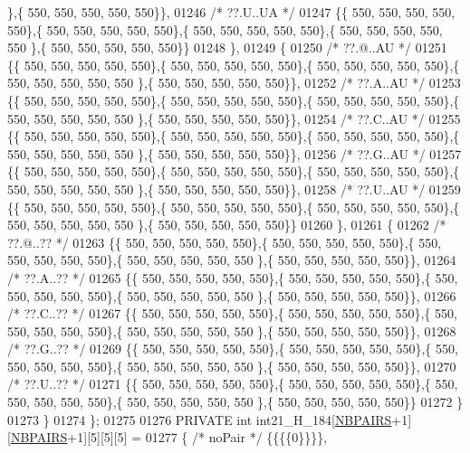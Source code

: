 \begin{DoxyCode}
      \},\{ 550, 550, 550, 550, 550\}\},
01246 \textcolor{comment}{/* ??.U..UA */}
01247 \{\{ 550, 550, 550, 550, 550\},\{ 550, 550, 550, 550, 550\},\{ 550, 550, 550, 550, 550\},\{ 550, 550, 550, 550, 550
      \},\{ 550, 550, 550, 550, 550\}\}
01248 \},
01249 \{
01250 \textcolor{comment}{/* ??.@..AU */}
01251 \{\{ 550, 550, 550, 550, 550\},\{ 550, 550, 550, 550, 550\},\{ 550, 550, 550, 550, 550\},\{ 550, 550, 550, 550, 550
      \},\{ 550, 550, 550, 550, 550\}\},
01252 \textcolor{comment}{/* ??.A..AU */}
01253 \{\{ 550, 550, 550, 550, 550\},\{ 550, 550, 550, 550, 550\},\{ 550, 550, 550, 550, 550\},\{ 550, 550, 550, 550, 550
      \},\{ 550, 550, 550, 550, 550\}\},
01254 \textcolor{comment}{/* ??.C..AU */}
01255 \{\{ 550, 550, 550, 550, 550\},\{ 550, 550, 550, 550, 550\},\{ 550, 550, 550, 550, 550\},\{ 550, 550, 550, 550, 550
      \},\{ 550, 550, 550, 550, 550\}\},
01256 \textcolor{comment}{/* ??.G..AU */}
01257 \{\{ 550, 550, 550, 550, 550\},\{ 550, 550, 550, 550, 550\},\{ 550, 550, 550, 550, 550\},\{ 550, 550, 550, 550, 550
      \},\{ 550, 550, 550, 550, 550\}\},
01258 \textcolor{comment}{/* ??.U..AU */}
01259 \{\{ 550, 550, 550, 550, 550\},\{ 550, 550, 550, 550, 550\},\{ 550, 550, 550, 550, 550\},\{ 550, 550, 550, 550, 550
      \},\{ 550, 550, 550, 550, 550\}\}
01260 \},
01261 \{
01262 \textcolor{comment}{/* ??.@..?? */}
01263 \{\{ 550, 550, 550, 550, 550\},\{ 550, 550, 550, 550, 550\},\{ 550, 550, 550, 550, 550\},\{ 550, 550, 550, 550, 550
      \},\{ 550, 550, 550, 550, 550\}\},
01264 \textcolor{comment}{/* ??.A..?? */}
01265 \{\{ 550, 550, 550, 550, 550\},\{ 550, 550, 550, 550, 550\},\{ 550, 550, 550, 550, 550\},\{ 550, 550, 550, 550, 550
      \},\{ 550, 550, 550, 550, 550\}\},
01266 \textcolor{comment}{/* ??.C..?? */}
01267 \{\{ 550, 550, 550, 550, 550\},\{ 550, 550, 550, 550, 550\},\{ 550, 550, 550, 550, 550\},\{ 550, 550, 550, 550, 550
      \},\{ 550, 550, 550, 550, 550\}\},
01268 \textcolor{comment}{/* ??.G..?? */}
01269 \{\{ 550, 550, 550, 550, 550\},\{ 550, 550, 550, 550, 550\},\{ 550, 550, 550, 550, 550\},\{ 550, 550, 550, 550, 550
      \},\{ 550, 550, 550, 550, 550\}\},
01270 \textcolor{comment}{/* ??.U..?? */}
01271 \{\{ 550, 550, 550, 550, 550\},\{ 550, 550, 550, 550, 550\},\{ 550, 550, 550, 550, 550\},\{ 550, 550, 550, 550, 550
      \},\{ 550, 550, 550, 550, 550\}\}
01272 \}
01273 \}
01274 \};
01275 
01276 PRIVATE \textcolor{keywordtype}{int} int21\_H\_184[\hyperlink{energy__const_8h_a5e75221c779d618eab81e096f37e32ce}{NBPAIRS}+1][\hyperlink{energy__const_8h_a5e75221c779d618eab81e096f37e32ce}{NBPAIRS}+1][5][5][5] =
01277 \{ \textcolor{comment}{/* noPair */} \{\{\{\{0\}\}\}\},

\end{DoxyCode}
